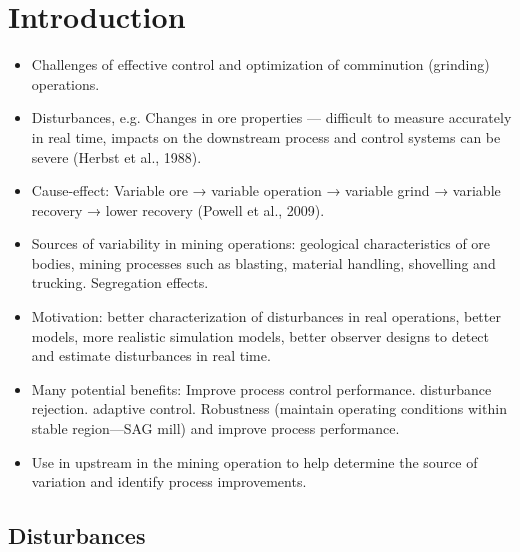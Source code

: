 \chapter*{Introduction}         %
\label{chap-introduction}       %


\begin{itemize}
	\item Challenges of effective control and optimization of comminution (grinding) operations.
	\item Disturbances, e.g. Changes in ore properties — difficult to measure accurately in real time, impacts on the downstream process and control systems can be severe (Herbst et al., 1988).
	\item Cause-effect: Variable ore → variable operation → variable grind → variable recovery → lower recovery (Powell et al., 2009).
	\item Sources of variability in mining operations: geological characteristics of ore bodies, mining processes such as blasting, material handling, shovelling and trucking. Segregation effects.

\item Motivation: better characterization of disturbances in real operations, better models, more realistic simulation models, better observer designs to detect and estimate disturbances in real time.
\item Many potential benefits: Improve process control performance. disturbance rejection. adaptive control. Robustness (maintain operating conditions within stable region—SAG mill) and improve process performance.
\item Use in upstream in the mining operation to help determine the source of variation and identify process improvements.
\end{itemize}

\section*{Disturbances}

